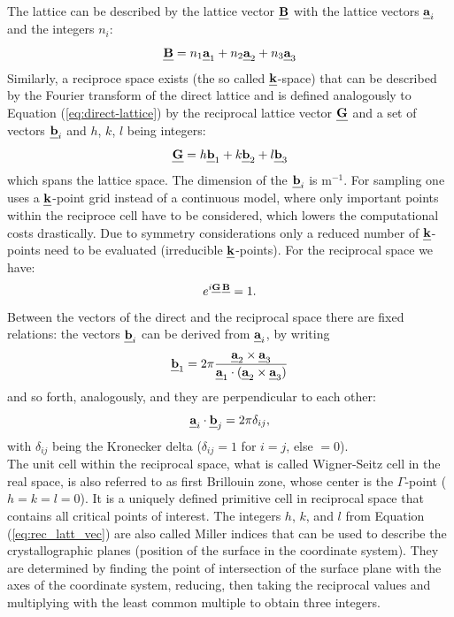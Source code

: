 \documentclass[11pt,DIV=13,BCOR=5mm,a4paper,headinclude]{scrbook}
\def\mathbi#1{\textbf{\em #1}}
\renewcommand{\vec}[1]{\mathbi{#1}}
\begin{document}
The lattice can be described by the lattice vector $\vec{B}$ with the lattice vectors $\vec{a}_i$ and the integers $n_i$:
\begin{equation}\label{eq:direct-lattice}
 \vec{B}=n_1\vec{a}_1+n_2\vec{a}_2+n_3\vec{a}_3
\end{equation}
Similarly, a reciproce space exists (the so called $\vec{k}$-space) that can be described by the Fourier transform of the direct lattice and is defined analogously to Equation (\ref{eq:direct-lattice}) by the reciprocal lattice vector $\vec{G}$ and a set of vectors $\vec{b}_i$ and $h$, $k$, $l$ being integers:
\begin{equation}\label{eq:rec_latt_vec}
 \vec{G}=h\vec{b}_1+k\vec{b}_2+l\vec{b}_3
\end{equation}
which spans the lattice space.
The dimension of the $\vec{b}_i$ is m$^{-1}$.
For sampling one uses a $\vec{k}$-point grid instead of a continuous model, where only important points within the reciproce cell have to be considered, which lowers the computational costs drastically.
Due to symmetry considerations only a reduced number of $\vec{k}$-points need to be evaluated (irreducible $\vec{k}$-points).
 For the reciprocal space we have:
\begin{equation}
 e^{i\vec{G}\,\vec{B}}=1.
\end{equation}
Between the vectors of the direct and the reciprocal space there are fixed relations: the vectors $\vec{b}_i$  can be derived from $\vec{a}_i$, by writing
\begin{equation}
\vec{b}_1=2\pi\frac{\vec{a}_2 \times \vec{a}_3}{\vec{a}_1\cdot(\vec{a}_2 \times \vec{a}_3)} 
\end{equation}
and so forth, analogously, and they are perpendicular to each other:
\begin{equation}
 \vec{a}_i\cdot\vec{b}_j=2\pi\delta_{ij},
\end{equation} 
with $\delta_{ij}$ being the Kronecker delta ($\delta_{ij}=1$ for $i=j$, else $=0$).
\\
The unit cell within the reciprocal space, what is called Wigner-Seitz cell in the real space, is also referred to as first Brillouin zone, whose center is the $\Gamma$-point ($h=k=l=0$).
It is a uniquely defined primitive cell in reciprocal space that contains all critical points of interest.
The integers $h$, $k$, and $l$ from Equation (\ref{eq:rec_latt_vec}) are also called Miller indices that can be used to describe the crystallographic planes (position of the surface in the coordinate system).
They are determined by finding the point of intersection of the surface plane with the axes of the coordinate system, reducing, then taking the reciprocal values and multiplying with the least common multiple to obtain three integers.
\end{document}
